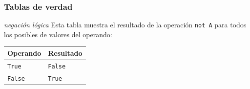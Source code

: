 \documentclass{beamer}
\begin{document}
\begin{frame}[fragile]
    \frametitle{Tablas de verdad}
    \begin{block}{{\em negación lógica}}
        Esta tabla muestra el resultado de la operación \texttt{not A} para todos los posibles de valores del operando:
        \begin{center}
            \begin{table}[]
                \begin{tabular}{@{}ll@{}}
                \toprule
                 Operando &  Resultado \\ \midrule
                 \texttt{True} & \texttt{False} \\
                 \texttt{False} & \texttt{True} \\
                 \bottomrule
                \end{tabular}
            \end{table}
        \end{center}
    \end{block}
    \end{frame}

\end{document}
